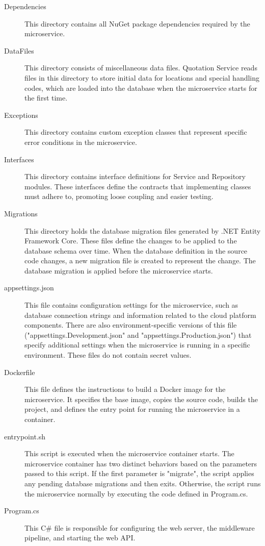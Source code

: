 \documentclass[12pt, reqno, oneside]{amsbook}
\theoremstyle{definition}
\theoremstyle{definition}
\numberwithin{section}{chapter}
\numberwithin{table}{chapter}
\numberwithin{figure}{chapter}
\begin{document}
\begin{description}
  \item[Dependencies] This directory contains all NuGet package dependencies required by the microservice.
  \item[DataFiles] This directory consists of miscellaneous data files. Quotation Service reads files in this directory to store initial data for locations and special handling codes, which are loaded into the database when the microservice starts for the first time.
  \item[Exceptions] This directory contains custom exception classes that represent specific error conditions in the microservice.
  \item[Interfaces] This directory contains interface definitions for Service and Repository modules. These interfaces define the contracts that implementing classes must adhere to, promoting loose coupling and easier testing.
  \item[Migrations] This directory holds the database migration files generated by .NET Entity Framework Core. These files define the changes to be applied to the database schema over time. When the database definition in the source code changes, a new migration file is created to represent the change. The database migration is applied before the microservice starts.
  \item[appsettings.json] This file contains configuration settings for the microservice, such as database connection strings and information related to the cloud platform components. There are also environment-specific versions of this file ("appsettings.Development.json" and "appsettings.Production.json") that specify additional settings when the microservice is running in a specific environment. These files do not contain secret values.
  \item[Dockerfile] This file defines the instructions to build a Docker image for the microservice. It specifies the base image, copies the source code, builds the project, and defines the entry point for running the microservice in a container.
  \item[entrypoint.sh] This script is executed when the microservice container starts. The microservice container has two distinct behaviors based on the parameters passed to this script. If the first parameter is "migrate", the script applies any pending database migrations and then exits. Otherwise, the script runs the microservice normally by executing the code defined in Program.cs.
  \item[Program.cs] This C\# file is responsible for configuring the web server, the middleware pipeline, and starting the web \ac{API}.
\end{description}
\end{document}
